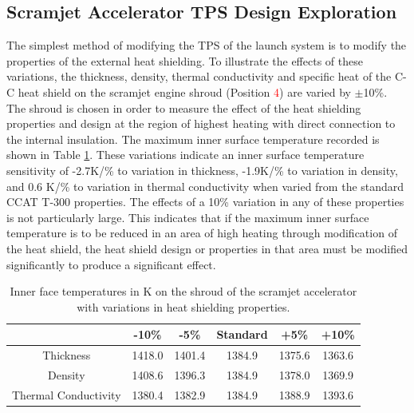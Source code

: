 \subsection{Scramjet Accelerator TPS Design Exploration}

The simplest method of modifying the TPS of the launch system is to modify the properties of the external heat shielding. 
To illustrate the effects of these variations, the thickness, density, thermal conductivity and specific heat of the C-C heat shield on the scramjet engine shroud (Position \textcolor{red}{4}) are varied by $\pm$10\%. The shroud is chosen in order to measure the effect of the heat shielding properties and design at the region of highest heating with direct connection to the internal insulation. The maximum inner surface temperature recorded is shown in Table \ref{tab:tpsscramjet}. These variations indicate an inner surface temperature sensitivity of -2.7K/\% to variation in thickness, -1.9K/\% to variation in density, and 0.6 K/\% to variation in thermal conductivity when varied from the standard CCAT T-300 properties. 
The effects of a 10\% variation in any of these properties is not particularly large. This indicates that if the maximum inner surface temperature is to be reduced in an area of high heating through modification of the heat shield, the heat shield design or properties in that area must be modified significantly to produce a significant effect. 


\begin{table}[ht]
	\centering
	\begin{tabular}{|c|c|c|c|c|c|}
		\hline  & -10\% & -5\% & Standard & +5\% & +10\% \\ 
		\hline Thickness & 1418.0 & 1401.4 & 1384.9  &   1375.6&   1363.6\\ 
		\hline Density & 1408.6 &  1396.3  & 1384.9 &  1378.0&  1369.9\\ 
		\hline Thermal Conductivity &  1380.4 & 1382.9 & 1384.9 &  1388.9& 1393.6\\ 
		\hline 
	\end{tabular}
	
	\caption{Inner face temperatures in K on the shroud of the scramjet accelerator with variations in heat shielding properties.}
	\label{tab:tpsscramjet}
	\end{table}

